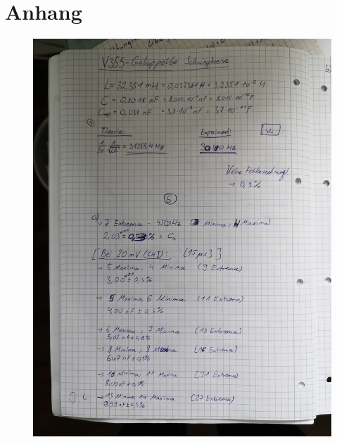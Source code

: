 \newpage
\section{Anhang}
\label{sec:anhang}

\begin{figure}
    \centering
    \includegraphics[scale=0.23]{content/Bilder/IMG_20191215_141702.jpg}
\end{figure}
\newpage
